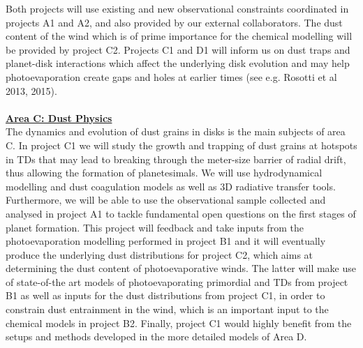 \documentclass[10pt,fleqn,twoside]{article}
\newcommand{\AreacolC}{\color{YellowOrange}}
\begin{document}
Both projects will use existing and new observational
constraints coordinated in projects A1 and A2, and also provided by
our external collaborators. The dust 
content of the wind which is of prime importance for the chemical
modelling will be provided by project C2. Projects C1 and D1 will
inform us on dust traps and 
planet-disk
interactions which affect the underlying disk evolution and may help
photoevaporation create gaps and holes at 
earlier times (see e.g. Rosotti et al 2013, 2015).\\ 

%
\mbox{}\vspace{1em}\\
\noindent\underline{\bf\AreacolC Area C: Dust Physics}\\
\noindent The dynamics and evolution of dust grains in disks is the
main subjects of area C. In project C1 we will study the growth and
trapping of dust grains at hotspots in TDs that may lead
to breaking through the meter-size barrier of radial drift, thus
allowing the formation of planetesimals. We will use hydrodynamical
modelling and dust coagulation models as well as 3D 
radiative transfer tools. Furthermore, we will be able to use the
observational sample collected and analysed in project A1 to tackle
fundamental open questions on the first stages of planet
formation. This project will feedback and take inputs from the
photoevaporation modelling performed in project B1 and it will
eventually produce
the underlying dust distributions for project C2, which aims at
determining the dust content of photoevaporative winds. The latter
will make use of state-of-the art models of photoevaporating
primordial and TDs from project B1 as well as inputs for the dust distributions from
project C1, in order to constrain dust entrainment in the wind, which
is an important input to the chemical models in project B2. Finally,
project C1 would highly benefit from the setups and methods developed
in the more detailed models of Area D.\\ 


\end{document}
